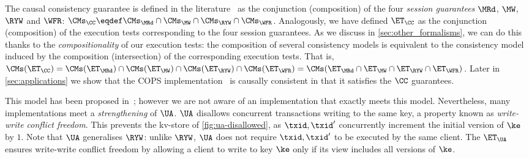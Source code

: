 %
%
%
%
%
The causal consistency guarantee is defined in the literature~\cite{session2causal} as the conjunction (composition) of the four \emph{session guarantees} \(\MRd\), \(\MW\), \(\RYW\) and \(\WFR\):   
$\CMs_{\CC} \eqdef \CMs_{\MRd} \cap \CMs_{\MW} \cap \CMs_{\RYW} \cap \CMs_{\WFR}$. 
Analogously, we have defined $\ET_\CC$ as the conjunction (composition) of the execution tests corresponding to the four session guarantees.
As we discuss in \cref{sec:other_formalisms}, we can do this thanks to the \emph{compositionality} of our execution tests:
the composition of several consistency models is equivalent to the consistency model induced by the composition (intersection) of the corresponding execution tests. 
That is, $\CMs(\ET_\CC) = \CMs(\ET_{\MRd}) \cap \CMs(\ET_{\MW}) \cap \CMs(\ET_{\RYW}) \cap \CMs(\ET_{\WFR}) = \CMs(\ET_{\MRd} \cap \ET_{\MW} \cap \ET_{\RYW} \cap \ET_{\WFR})$.
Later in \cref{sec:applications} we show that the COPS implementation~\cite{cops} is causally consistent in that it satisfies the $\CC$ guarantees. 
  

This model has been proposed in~\cite{framework-concur};
however we are not aware of an implementation that exactly meets  this model.
Nevertheless, many implementations meet a
\emph{strengthening} of $\UA$.
$\UA$ disallows concurrent transactions writing to the same key,
a property known as \emph{write-write conflict freedom}.
This prevents the kv-store of \cref{fig:ua-disallowed},
as $\txid, \txid'$ concurrently increment the initial version of $\ke$ by $1$.
Note that $\UA$ generalises $\RYW$: unlike $\RYW$, $\UA$ does not require $\txid, \txid'$ to be executed by the same client.
The $\ET_\UA$ ensures write-write conflict freedom by allowing a client to write to key $\ke$
only if its view includes all versions of $\ke$.


